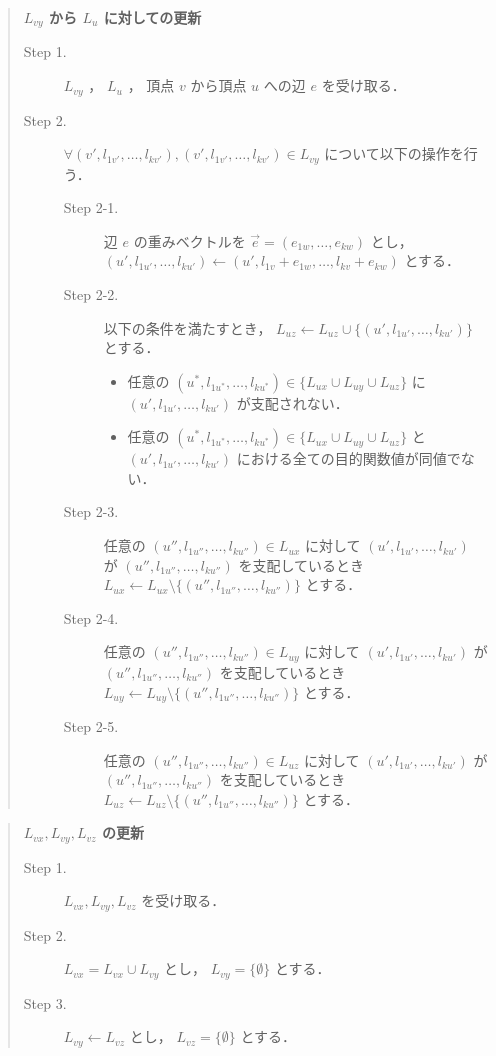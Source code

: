 \documentclass[12pt]{optlab-bachelor}
\begin{document}
\begin{quote}
  \textbf{ $L_{vy}$ から $L_u$ に対しての更新}
  \begin{description}
    \item[Step 1.] $L_{vy}$ ， $L_u$ ， 頂点 $v$ から頂点 $u$ への辺 $e$ を受け取る．
    \item[Step 2.] $\forall (v',l_{1v'},\ldots,l_{kv'}) ,
    (v',l_{1v'},\ldots,l_{kv'}) \in L_{vy}$ について以下の操作を行う．
    \begin{description}
      \item[Step 2-1.] 辺 $e$ の重みベクトルを
      $\vec{e} = (e_{1w},\ldots,e_{kw})$ とし，
      $(u',l_{1u'},\ldots,l_{ku'}) \leftarrow
      (u',l_{1v}+e_{1w},\ldots,l_{kv}+e_{kw})$ とする．
      \item[Step 2-2.] 以下の条件を満たすとき，
      $L_{uz} \leftarrow L_{uz} \cup \{(u',l_{1u'},\ldots,l_{ku'})\}$ とする．
      \begin{itemize}
        \item 任意の $(u^*,l_{1u^*},\ldots,l_{ku^*})\in \{L_{ux} \cup L_{uy} \cup L_{uz}\}$ に
        $(u',l_{1u'},\ldots,l_{ku'})$ が支配されない．
        \item 任意の $(u^*,l_{1u^*},\ldots,l_{ku^*}) \in \{L_{ux} \cup L_{uy} \cup L_{uz}\}$ と
        $(u',l_{1u'},\ldots,l_{ku'})$ における全ての目的関数値が同値でない．
      \end{itemize}
      \item[Step 2-3.] 任意の $(u'',l_{1u''},\ldots,l_{ku''})\in L_{ux}$
      に対して $(u',l_{1u'},\ldots,l_{ku'})$ が
      $(u'',l_{1u''},\ldots,l_{ku''})$ を支配しているとき
      $L_{ux} \leftarrow L_{ux} \setminus \{(u'',l_{1u''},\ldots,l_{ku''})\}$ とする．
      \item[Step 2-4.] 任意の $(u'',l_{1u''},\ldots,l_{ku''})\in L_{uy}$
      に対して $(u',l_{1u'},\ldots,l_{ku'})$ が
      $(u'',l_{1u''},\ldots,l_{ku''})$ を支配しているとき
      $L_{uy} \leftarrow L_{uy} \setminus \{(u'',l_{1u''},\ldots,l_{ku''})\}$ とする．
      \item[Step 2-5.] 任意の $(u'',l_{1u''},\ldots,l_{ku''})\in L_{uz}$
      に対して $(u',l_{1u'},\ldots,l_{ku'})$ が
      $(u'',l_{1u''},\ldots,l_{ku''})$ を支配しているとき
      $L_{uz} \leftarrow L_{uz} \setminus \{(u'',l_{1u''},\ldots,l_{ku''})\}$ とする．
    \end{description}
  \end{description}
\end{quote}

\begin{quote}
  \textbf{ $L_{vx},L_{vy},L_{vz}$ の更新}
  \begin{description}
    \item[Step 1.] $L_{vx},L_{vy},L_{vz}$ を受け取る．
    \item[Step 2.] $L_{vx} = L_{vx} \cup L_{vy}$ とし，
    $L_{vy} = \{ \emptyset \}$ とする．
    \item[Step 3.] $L_{vy} \leftarrow L_{vz}$ とし，
    $L_{vz} = \{ \emptyset \}$ とする．
  \end{description}
\end{quote}
\end{document}
